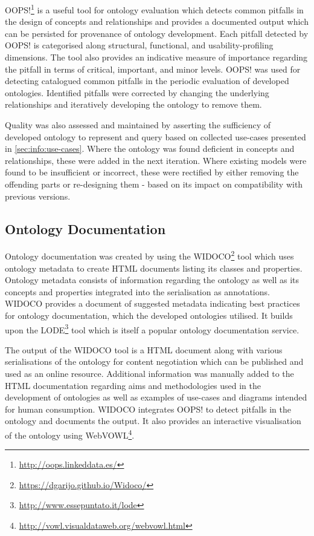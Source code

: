 OOPS!\footnote{\url{http://oops.linkeddata.es/}} \cite{poveda-villalon_oops!_2014} is a useful tool for ontology evaluation which detects common pitfalls in the design of concepts and relationships and provides a documented output which can be persisted for provenance of ontology development. Each pitfall detected by OOPS! is categorised along  structural, functional, and usability-profiling dimensions. The tool also provides an indicative measure of importance regarding the pitfall in terms of critical, important, and minor levels.
OOPS! was used for detecting catalogued common pitfalls in the periodic evaluation of developed ontologies. Identified pitfalls were corrected by changing the underlying relationships and iteratively developing the ontology to remove them. 

Quality was also assessed and maintained by asserting the sufficiency of developed ontology to represent and query based on collected use-cases presented in \autoref{sec:info:use-cases}. Where the ontology was found deficient in concepts and relationships, these were added in the next iteration. Where existing models were found to be insufficient or incorrect, these were rectified by either removing the offending parts or re-designing them - based on its impact on compatibility with previous versions.

\subsection{Ontology Documentation}
Ontology documentation was created by using the WIDOCO\footnote{\url{https://dgarijo.github.io/Widoco/}} \cite{garijo_widoco_2017} tool which uses ontology metadata to create HTML documents listing its classes and properties. Ontology metadata consists of information regarding the ontology as well as its concepts and properties integrated into the serialisation as annotations. WIDOCO provides a document of suggested metadata indicating best practices for ontology documentation, which the developed ontologies utilised. It builds upon the LODE\footnote{\url{http://www.essepuntato.it/lode}} tool which is itself a popular ontology documentation service.

The output of the WIDOCO tool is a HTML document along with various serialisations of the ontology for content negotiation which can be published and used as an online resource. Additional information was manually added to the HTML documentation regarding aims and methodologies used in the development of ontologies as well as examples of use-cases and diagrams intended for human consumption. WIDOCO integrates OOPS! to detect pitfalls in the ontology and documents the output. It also provides an interactive visualisation of the ontology using WebVOWL\footnote{\url{http://vowl.visualdataweb.org/webvowl.html}}.


